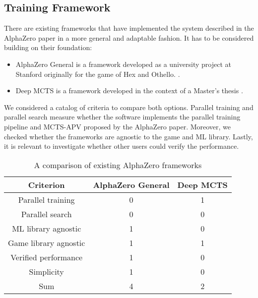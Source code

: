 \subsection{Training Framework}
\label{training_framework}
There are existing frameworks that have implemented the system described in the AlphaZero paper in a more general and adaptable fashion. It has to be considered building on their foundation:

\begin{itemize}
    \item AlphaZero General is a framework developed as a university project at Stanford originally for the game of Hex and Othello. \cite{thakoor_learning_nodate,thakoor_suragnairalpha-zero-general_nodate}.
    \item Deep MCTS is a framework developed in the context of a Master's thesis \cite{bruasdal_deep_2020,henribru_deep_2021}.
\end{itemize}

We considered a catalog of criteria to compare both options. Parallel training and parallel search measure whether the software implements the parallel training pipeline and MCTS-APV proposed by the AlphaZero paper. Moreover, we checked whether the frameworks are agnostic to the game and ML library. Lastly, it is relevant to investigate whether other users could verify the performance.

\begin{table*}
    \begin{center}
        \begin{tabular}{ c|c|c }
            Criterion             & AlphaZero General & Deep MCTS \\
            \hline
            \hline
            Parallel training     & 0                 & 1         \\
            Parallel search       & 0                 & 0         \\
            ML library agnostic   & 1                 & 0         \\
            Game library agnostic & 1                 & 1         \\
            Verified performance  & 1                 & 0         \\
            Simplicity            & 1                 & 0         \\
            \hline
            \hline
            Sum                   & 4                 & 2         \\
        \end{tabular}
    \end{center}
    \caption{A comparison of existing AlphaZero frameworks}\label{training_framework_comparison}
\end{table*}

